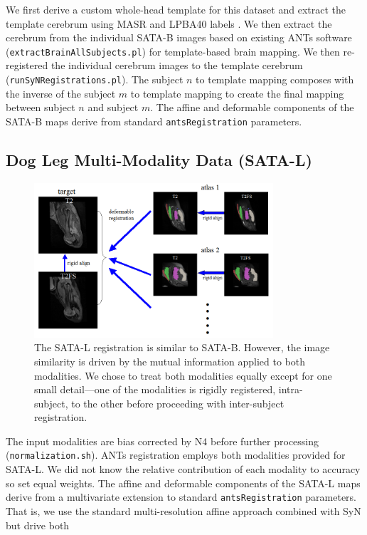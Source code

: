 \documentclass{llncs}
\begin{document}
We first derive a custom whole-head template for this dataset and
extract the template cerebrum using MASR and LPBA40 labels \cite{Shattuck2008}.
We then extract the cerebrum from the individual SATA-B images based
on existing ANTs software (\texttt{extractBrainAllSubjects.pl}) for
template-based brain mapping.  We then re-registered the individual
cerebrum images to the template cerebrum
(\texttt{runSyNRegistrations.pl}).  The subject $n$ to template
mapping composes with the inverse of the subject $m$ to template
mapping to create the final mapping between subject $n$ and subject $m$.
The affine and deformable components of the SATA-B maps derive from
standard \texttt{antsRegistration} parameters.  
 
\subsection{Dog Leg Multi-Modality Data (SATA-L)}
\begin{figure}[t]
 \centering 
  \includegraphics[width=3.5in]{../figs/canine-leg-registration.png}
 \caption{The SATA-L registration is similar to SATA-B.  However, the
image similarity is driven by the mutual information applied to both
modalities.  We chose to treat both modalities equally except for one
small detail---one of the modalities is rigidly registered,
intra-subject, to the other before proceeding with inter-subject
registration.}
 \label{fig:Lmethods}
\end{figure}
The input modalities are
bias corrected by N4 \cite{Tustison2010} before further processing (\texttt{normalization.sh}).  ANTs
registration employs both modalities provided for SATA-L.  We did not
know the relative contribution of each modality to accuracy so set
equal weights.  The affine and deformable components of the SATA-L
maps derive from a multivariate extension to standard
\texttt{antsRegistration} parameters.  That is, we use the standard
multi-resolution affine approach combined with SyN but drive both
\end{document}
